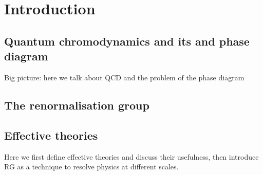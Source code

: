 \chapter{Introduction}
\label{chap:introduction}

\section{Quantum chromodynamics and its and phase diagram}
Big picture: here we talk about QCD and the problem of the phase diagram
\section{The renormalisation group}
\section{Effective theories}
Here we first define effective theories and discuss their usefulness, then introduce RG as a technique to resolve physics at different scales.